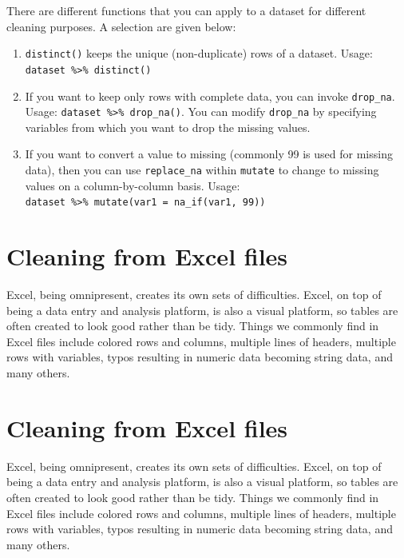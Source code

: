 \documentclass[12pt,letterpaperpaper,openany]{book}
\providecommand{\tightlist}{%
  \setlength{\itemsep}{0pt}\setlength{\parskip}{0pt}}
\begin{document}
There are different functions that you can apply to a dataset for different cleaning purposes. A selection
are given below:

\begin{enumerate}
\def\labelenumi{\arabic{enumi}.}
\tightlist
\item
  \texttt{distinct()} keeps the unique (non-duplicate) rows of a dataset. Usage: \texttt{dataset\ \%\textgreater{}\%\ distinct()}
\item
  If you want to keep only rows with complete data, you can invoke \texttt{drop\_na}. Usage: \texttt{dataset\ \%\textgreater{}\%\ drop\_na()}. You
  can modify \texttt{drop\_na} by specifying variables from which you want to drop the missing values.
\item
  If you want to convert a value to missing (commonly 99 is used for missing data), then you can use \texttt{replace\_na} within \texttt{mutate} to change to missing values on a column-by-column basis. Usage: \texttt{dataset\ \%\textgreater{}\%\ mutate(var1\ =\ na\_if(var1,\ 99))}
\end{enumerate}

\hypertarget{cleaning-from-excel-files}{%
\section{Cleaning from Excel files}\label{cleaning-from-excel-files}}

Excel, being omnipresent, creates its own sets of difficulties. Excel, on top of being a data entry and
analysis platform, is also a visual platform, so tables are often created to look good rather than be tidy. Things
we commonly find in Excel files include colored rows and columns, multiple lines of headers, multiple rows with variables, typos resulting in numeric data becoming string data, and many others.

\hypertarget{cleaning-from-excel-files-1}{%
\section{Cleaning from Excel files}\label{cleaning-from-excel-files-1}}

Excel, being omnipresent, creates its own sets of difficulties. Excel, on top of being a data entry and
analysis platform, is also a visual platform, so tables are often created to look good rather than be tidy. Things
we commonly find in Excel files include colored rows and columns, multiple lines of headers, multiple rows with variables, typos resulting in numeric data becoming string data, and many others.
\end{document}
